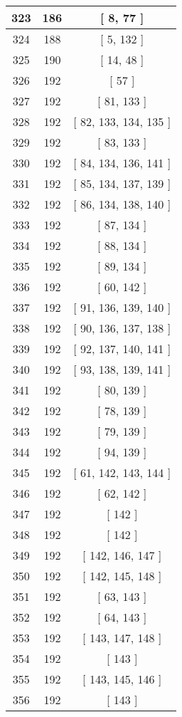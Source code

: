 \begin{center}
\begin{longtable}[H]{|| c c c ||}
\hline
323 & 186 & [ 8, 77 ] \\ 
\hline
324 & 188 & [ 5, 132 ] \\ 
\hline
325 & 190 & [ 14, 48 ] \\ 
\hline
326 & 192 & [ 57 ] \\ 
\hline
327 & 192 & [ 81, 133 ] \\ 
\hline
328 & 192 & [ 82, 133, 134, 135 ] \\ 
\hline
329 & 192 & [ 83, 133 ] \\ 
\hline
330 & 192 & [ 84, 134, 136, 141 ] \\ 
\hline
331 & 192 & [ 85, 134, 137, 139 ] \\ 
\hline
332 & 192 & [ 86, 134, 138, 140 ] \\ 
\hline
333 & 192 & [ 87, 134 ] \\ 
\hline
334 & 192 & [ 88, 134 ] \\ 
\hline
335 & 192 & [ 89, 134 ] \\ 
\hline
336 & 192 & [ 60, 142 ] \\ 
\hline
337 & 192 & [ 91, 136, 139, 140 ] \\ 
\hline
338 & 192 & [ 90, 136, 137, 138 ] \\ 
\hline
339 & 192 & [ 92, 137, 140, 141 ] \\ 
\hline
340 & 192 & [ 93, 138, 139, 141 ] \\ 
\hline
341 & 192 & [ 80, 139 ] \\ 
\hline
342 & 192 & [ 78, 139 ] \\ 
\hline
343 & 192 & [ 79, 139 ] \\ 
\hline
344 & 192 & [ 94, 139 ] \\ 
\hline
345 & 192 & [ 61, 142, 143, 144 ] \\ 
\hline
346 & 192 & [ 62, 142 ] \\ 
\hline
347 & 192 & [ 142 ] \\ 
\hline
348 & 192 & [ 142 ] \\ 
\hline
349 & 192 & [ 142, 146, 147 ] \\ 
\hline
350 & 192 & [ 142, 145, 148 ] \\ 
\hline
351 & 192 & [ 63, 143 ] \\ 
\hline
352 & 192 & [ 64, 143 ] \\ 
\hline
353 & 192 & [ 143, 147, 148 ] \\ 
\hline
354 & 192 & [ 143 ] \\ 
\hline
355 & 192 & [ 143, 145, 146 ] \\ 
\hline
356 & 192 & [ 143 ] \\ 

\end{longtable}
\end{center}

